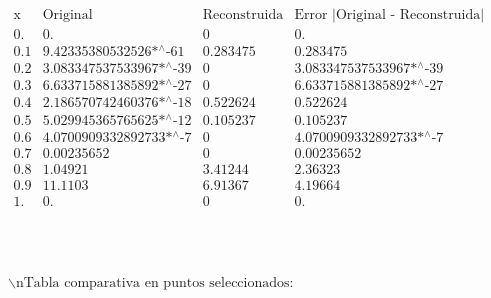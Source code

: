 \documentclass{article}
\begin{document}
\noindent\(\begin{array}{cccc}
 \text{x} & \text{Original} & \text{Reconstruida} & \text{Error $|$Original - Reconstruida$|$} \\
 0. & 0. & 0 & 0. \\
 0.1 & \text{9.42335380532526$\grave{ }$*${}^{\wedge}$-61} & 0.283475 & 0.283475 \\
 0.2 & \text{3.083347537533967$\grave{ }$*${}^{\wedge}$-39} & 0 & \text{3.083347537533967$\grave{ }$*${}^{\wedge}$-39} \\
 0.3 & \text{6.633715881385892$\grave{ }$*${}^{\wedge}$-27} & 0 & \text{6.633715881385892$\grave{ }$*${}^{\wedge}$-27} \\
 0.4 & \text{2.186570742460376$\grave{ }$*${}^{\wedge}$-18} & 0.522624 & 0.522624 \\
 0.5 & \text{5.029945365765625$\grave{ }$*${}^{\wedge}$-12} & 0.105237 & 0.105237 \\
 0.6 & \text{4.0700909332892733$\grave{ }$*${}^{\wedge}$-7} & 0 & \text{4.0700909332892733$\grave{ }$*${}^{\wedge}$-7} \\
 0.7 & 0.00235652 & 0 & 0.00235652 \\
 0.8 & 1.04921 & 3.41244 & 2.36323 \\
 0.9 & 11.1103 & 6.91367 & 4.19664 \\
 1. & 0. & 0 & 0. \\
\end{array}\)

\noindent\(\begin{array}{cc}
 
\begin{array}{cc}
  &  \\
\end{array}
 &  \\
\end{array}\)

\noindent\(\text{$\backslash $nTabla comparativa en puntos seleccionados:}\)
\end{document}
